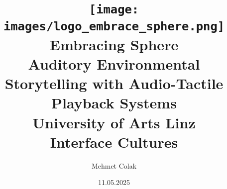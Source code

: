 \begin{titlepage}
  
    \author{Mehmet Colak}
    \title{\texttt{[image: images/logo\_embrace\_sphere.png]}\\[5ex]  Embracing Sphere\\[1ex] 
    \Large Auditory Environmental Storytelling with Audio-Tactile Playback Systems\\[4ex]
    \large University of Arts Linz\\[0.5ex]
    Interface Cultures\\[6ex]}
    \date{11.05.2025}

\end{titlepage}

\maketitle